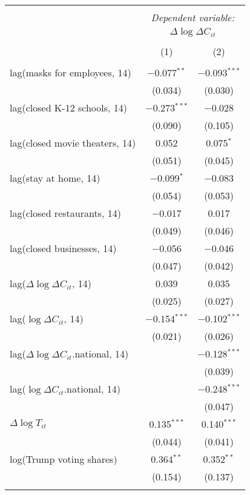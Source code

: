 \begin{tabular}{@{\extracolsep{1pt}}lcc} 
\\[-1.8ex]\hline 
\hline \\[-1.8ex] 
 & \multicolumn{2}{c}{\textit{Dependent variable:}} \\ 
\cline{2-3} 
 & \multicolumn{2}{c}{$\Delta \log \Delta C_{it}$} \\ 
\\[-1.8ex] & (1) & (2)\\ 
\hline \\[-1.8ex] 
 lag(masks for employees, 14) & $-$0.077$^{**}$ & $-$0.093$^{***}$ \\ 
  & (0.034) & (0.030) \\ 
  lag(closed K-12 schools, 14) & $-$0.273$^{***}$ & $-$0.028 \\ 
  & (0.090) & (0.105) \\ 
  lag(closed movie theaters, 14) & 0.052 & 0.075$^{*}$ \\ 
  & (0.051) & (0.045) \\ 
  lag(stay at home, 14) & $-$0.099$^{*}$ & $-$0.083 \\ 
  & (0.054) & (0.053) \\ 
  lag(closed restaurants, 14) & $-$0.017 & 0.017 \\ 
  & (0.049) & (0.046) \\ 
  lag(closed businesses, 14) & $-$0.056 & $-$0.046 \\ 
  & (0.047) & (0.042) \\ 
  lag($\Delta \log \Delta C_{it}$, 14) & 0.039 & 0.035 \\ 
  & (0.025) & (0.027) \\ 
  lag($\log \Delta C_{it}$, 14) & $-$0.154$^{***}$ & $-$0.102$^{***}$ \\ 
  & (0.021) & (0.026) \\ 
  lag($\Delta \log \Delta C_{it}$.national, 14) &  & $-$0.128$^{***}$ \\ 
  &  & (0.039) \\ 
  lag($\log \Delta C_{it}$.national, 14) &  & $-$0.248$^{***}$ \\ 
  &  & (0.047) \\ 
  $\Delta \log T_{it}$ & 0.135$^{***}$ & 0.140$^{***}$ \\ 
  & (0.044) & (0.041) \\ 
  log(Trump voting shares) & 0.364$^{**}$ & 0.352$^{**}$ \\ 
  & (0.154) & (0.137) \\ 
 \hline \\[-1.8ex] 

\end{tabular}
